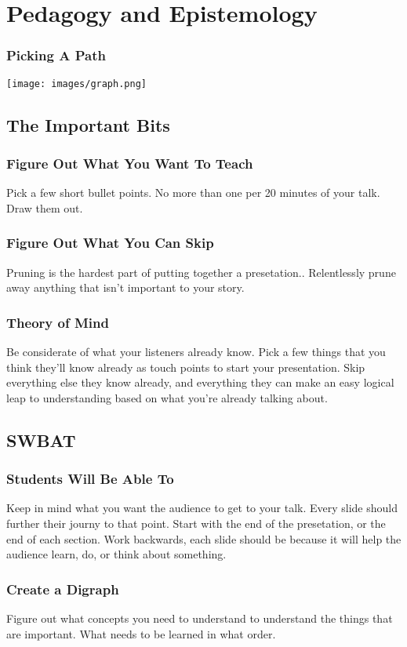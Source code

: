\documentclass{beamer}
\begin{document}
\section{Pedagogy and Epistemology}
\begin{frame}
  \frametitle{Picking A Path}
  \texttt{[image: images/graph.png]}
\end{frame}

\subsection{The Important Bits}

\begin{frame}
  \frametitle{Figure Out What You Want To Teach}
  Pick a few short bullet points.  No more than one per 20 minutes of
  your talk.  Draw them out.
\end{frame}

\begin{frame}
  \frametitle{Figure Out What You Can Skip}
  Pruning is the hardest part of putting together a presetation..
  Relentlessly prune away anything that isn't important to your story.
\end{frame}


\begin{frame}
  \frametitle{Theory of Mind}
  Be considerate of what your listeners already know.  Pick a few
  things that you think they'll know already as touch points to start
  your presentation.  Skip everything else they know already, and
  everything they can make an easy logical leap to understanding based
  on what you're already talking about.
\end{frame}

\subsection{SWBAT}

\begin{frame}
  \frametitle{Students Will Be Able To}
  Keep in mind what you want the audience to get to your talk.  Every
  slide should further their journy to that point.  Start with the end
  of the presetation, or the end of each section.  Work backwards,
  each slide should be because it will help the audience learn, do, or
  think about something.
\end{frame}


\begin{frame}
  \frametitle{Create a Digraph}
  Figure out what concepts you need to understand to understand the
  things that are important.  What needs to be learned in what order.
\end{frame}
\end{document}
